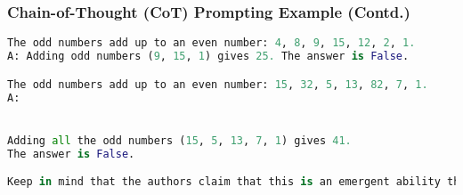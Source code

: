 \begin{frame}[fragile]\frametitle{Chain-of-Thought (CoT) Prompting Example (Contd.)}



\begin{lstlisting}[language=python]
The odd numbers add up to an even number: 4, 8, 9, 15, 12, 2, 1.
A: Adding odd numbers (9, 15, 1) gives 25. The answer is False.

The odd numbers add up to an even number: 15, 32, 5, 13, 82, 7, 1. 
A:


Adding all the odd numbers (15, 5, 13, 7, 1) gives 41. 
The answer is False.

Keep in mind that the authors claim that this is an emergent ability that arises with sufficiently large language models.

\end{lstlisting}



\end{frame}






			








			



